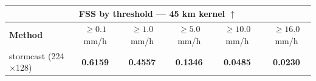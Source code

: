 \documentclass[border=10pt]{standalone}
\begin{document}
\begin{tabular}{lccccc}
\toprule
\multicolumn{6}{c}{\textbf{FSS by threshold — 45 km kernel} $\uparrow$} \\
\midrule
\textbf{Method} & $\geq 0.1$ mm/h & $\geq 1.0$ mm/h & $\geq 5.0$ mm/h & $\geq 10.0$ mm/h & $\geq 16.0$ mm/h \\
\midrule
stormcast (224$\times$128) & \textbf{0.6159} & \textbf{0.4557} & \textbf{0.1346} & \textbf{0.0485} & \textbf{0.0230} \\
\bottomrule
\end{tabular}
\end{document}
